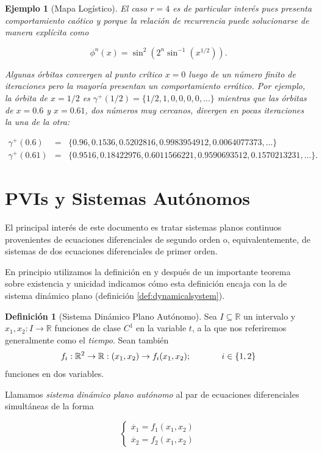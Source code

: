 \documentclass[11pt]{book}
\theoremstyle{definition}
\newtheorem{definition}{Definición}
\numberwithin{definition}{section}
\theoremstyle{theorem}
\numberwithin{theorem}{section}
\numberwithin{lemma}{section}
\numberwithin{corollary}{section}
\theoremstyle{plain}
\newtheorem{example}{Ejemplo}
\numberwithin{example}{section}
\newcommand{\R}{{\ensuremath{\mathbb{R}}}}
\begin{document}
\begin{example}[Mapa Logístico]
El caso $r = 4$ es de particular interés pues presenta comportamiento caótico \cite[p.~19]{fractallectures} y porque la relación de recurrencia puede solucionarse de manera explícita \cite{lorenz64} como

$$  \phi^n(x) = \sin^2( 2^n \sin^{-1}( x^{1/2} ) ). $$

Algunas órbitas convergen al punto crítico $x = 0$ luego de un número finito de iteraciones pero la mayoría presentan un comportamiento errático. Por ejemplo, la órbita de $x = 1/2$ es $\gamma^+(1/2) = \{ 1/2, 1, 0, 0, 0, 0, ... \}$ mientras que las órbitas de $x = 0.6$ y $x = 0.61$, dos números muy cercanos, divergen en pocas iteraciones la una de la otra:

$$
	\begin{array}{lll}
		\gamma^+(0.6) & = & \{ 0.96, 0.1536, 0.5202816, 0.9983954912, 0.0064077373, ... \} \\
	\gamma^+(0.61) & = & \{ 0.9516, 0.18422976, 0.6011566221, 0.9590693512, 0.1570213231, ... \}.
	\end{array}
$$

\end{example}

\section{PVIs y Sistemas Autónomos}
\label{sec:propiedades_generales}

El principal interés de este documento es tratar sistemas planos continuos provenientes de ecuaciones diferenciales de segundo orden o, equivalentemente, de sistemas de dos ecuaciones diferenciales de primer orden.

En principio utilizamos la definición en \cite[p.~174]{dynandbif} y después de un importante teorema sobre existencia y unicidad indicamos cómo esta definición encaja con la de sistema dinámico plano (definición \ref{def:dynamicalsystem}).

\begin{definition}[Sistema Dinámico Plano Autónomo] \label{def:sistema_dinamico_plano}
Sea $I \subseteq \R$ un intervalo y $x_1,x_2:I \rightarrow \R$ funciones de clase $C^1$ en la variable $t$, a la que nos referiremos generalmente como el \textit{tiempo}.
Sean también $$f_i : \R^2 \rightarrow \R: (x_1, x_2) \rightarrow f_i(x_1, x_2); \hspace{0.5in} i \in \{1,2\}$$ funciones en dos variables.

Llamamos \emph{sistema dinámico plano autónomo} al par de ecuaciones diferenciales simultáneas de la forma

\begin{equation} \label{eq:sistema_dinamico_plano_v0}
\left\{
    \begin{array}{l}
        \dot{x_1} = f_1(x_1, x_2) \\
        \dot{x_2} = f_2(x_1, x_2)
    \end{array} \right.
\end{equation}
\end{definition}
\end{document}
